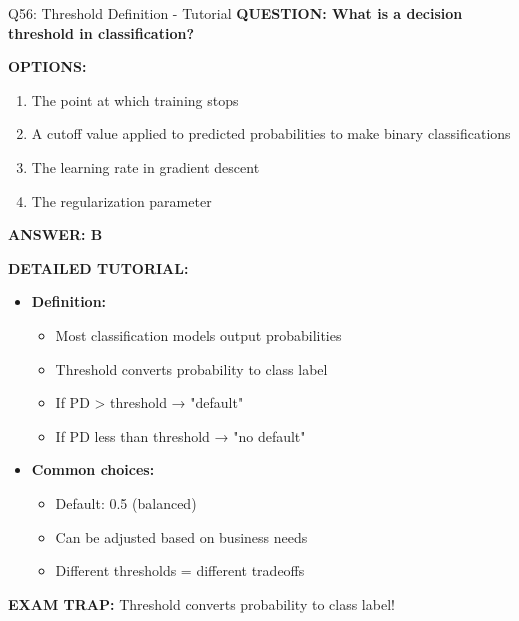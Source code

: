 \documentclass[8pt]{beamer}
\begin{document}
	\begin{frame}{Q56: Threshold Definition - Tutorial}
		\fontsize{6.5}{7.5}\selectfont
		\textbf{QUESTION: What is a decision threshold in classification?}
		
		\vspace{0.1cm}
		\textbf{OPTIONS:}
		\begin{enumerate}
			\item The point at which training stops
			\item A cutoff value applied to predicted probabilities to make binary classifications
			\item The learning rate in gradient descent
			\item The regularization parameter
		\end{enumerate}
		
		\vspace{0.1cm}
		\textcolor{myblue}{\textbf{ANSWER: B}}
		
		\vspace{0.1cm}
		\textbf{DETAILED TUTORIAL:}
		\begin{itemize}
			\item \textbf{Definition:}
			\begin{itemize}
				\item Most classification models output probabilities
				\item Threshold converts probability to class label
				\item If PD > threshold → "default"
				\item If PD less than threshold → "no default"
			\end{itemize}
			\item \textbf{Common choices:}
			\begin{itemize}
				\item Default: 0.5 (balanced)
				\item Can be adjusted based on business needs
				\item Different thresholds = different tradeoffs
			\end{itemize}
		\end{itemize}
		
		\textcolor{myred}{\textbf{EXAM TRAP:}} Threshold converts \textcolor{myblue}{probability to class label}!
	\end{frame}
	
\end{document}
